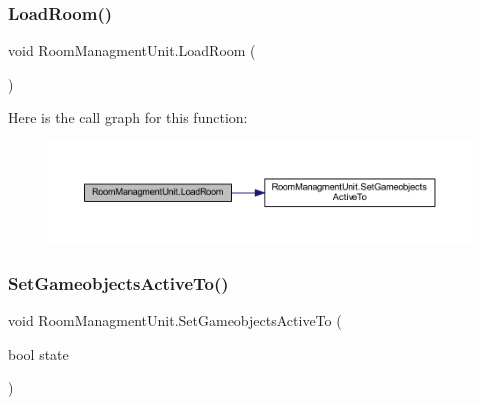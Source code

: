 \mbox{\label{class_room_managment_unit_a7f34dfb62166ebcbd2a314f0bcdb61e9}} 
\subsubsection{\texorpdfstring{Load\+Room()}{LoadRoom()}}
{\footnotesize\ttfamily void Room\+Managment\+Unit.\+Load\+Room (\begin{DoxyParamCaption}{ }\end{DoxyParamCaption})}

Here is the call graph for this function\+:
\nopagebreak
\begin{figure}[H]
\begin{center}
\leavevmode
\includegraphics[width=350pt]{class_room_managment_unit_a7f34dfb62166ebcbd2a314f0bcdb61e9_cgraph}
\end{center}
\end{figure}
\mbox{\label{class_room_managment_unit_ae39467cac522f23c198693c215968ad7}} 
\subsubsection{\texorpdfstring{Set\+Gameobjects\+Active\+To()}{SetGameobjectsActiveTo()}}
{\footnotesize\ttfamily void Room\+Managment\+Unit.\+Set\+Gameobjects\+Active\+To (\begin{DoxyParamCaption}\item[{bool}]{state }\end{DoxyParamCaption})\hspace{0.3cm}{\ttfamily [private]}}

